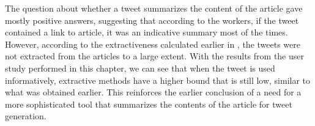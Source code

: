 The question about whether a tweet summarizes the content of the article gave mostly positive answers, suggesting that according to the workers, if the tweet contained a link to article, it was an indicative summary most of the times. However, according to the extractiveness calculated earlier in , the tweets were not extracted from the articles to a large extent. With the results from the user study performed in this chapter, we can see that when the tweet is used informatively, extractive methods have a higher bound that is still low, similar to what was obtained earlier. This reinforces the earlier conclusion of a need for a more sophisticated tool that summarizes the contents of the article for tweet generation.



